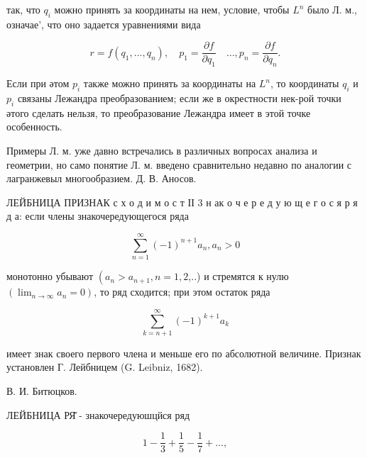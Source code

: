 \documentclass[10pt]{article}
\begin{document}
так, что $q_{i}$ можно принять за координаты на нем, условие, чтобы $L^{n}$ было Л. м., означае', что оно задается уравнениями вида



\[

r=f\left(q_{1}, \ldots, q_{n}\right), \quad p_{1}=\frac{\partial f}{\partial q_{1}} \quad \ldots, p_{n}=\frac{\partial f}{\partial q_{n}} .

\]



Если при әтом $p_{i}$ также можно принять за координаты на $L^{n}$, то координаты $q_{i}$ и $p_{i}$ связаны Лежандра преобразованием; если же в окрестности нек-рой точки әтого сделать нельзя, то преобразование Лежандра имеет в этой точке особенность.



Примеры Л. м. уже давно встречались в различных вопросах анализа и геометрии, но само понятие Л. м. введено сравнительно недавно по аналогии с лагранжевыл многообразием. Д. В. Аносов.



ЛЕЙБНИЦА ПРИЗНАК с х о д и м о с т ІІ 3 н ак о ч е р е д у ю щ е г о с я р я д а: если члены знакочередующегося ряда



\[

\sum_{n=1}^{\infty}(-1)^{n+1} a_{n}, a_{n}>0

\]



монотонно убывают $\left(a_{n}>a_{n+1}, n=1,2\right.$,..) и стремятся к нулю $\left(\lim _{n \rightarrow \infty} a_{n}=0\right)$, то ряд сходится; при этом остаток ряда



\[

\sum_{k=n+1}^{\infty}(-1)^{k+1} a_{k}

\]



имеет знак своего первого члена и меньше его по абсолютной величине. Признак установлен Г. Лейбницем (G. Leibniz, 1682).



В. И. Битюцков.



ЛЕЙБНИЦА РЯ̆ - знакочередуюшцйся ряд



\[

1-\frac{1}{3}+\frac{1}{5}-\frac{1}{7}+\ldots,

\]
\end{document}
